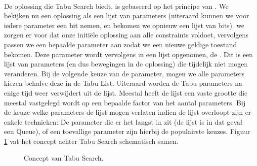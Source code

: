 \paragraph{}De oplossing die Tabu Search biedt, is gebaseerd op het principe van . We bekijken nu een oplossing als een lijst van parameters (uiteraard kunnen we voor iedere parameter een bit nemen, en bekomen we opnieuw een lijst van bits). we zorgen er voor dat onze initiële oplossing aan alle constraints voldoet, vervolgens passen we een bepaalde parameter aan zodat we een nieuwe geldige toestand bekomen. Deze parameter wordt vervolgens in een lijst opgenomen, de . Dit is een lijst van parameters (en dus bewegingen in de oplossing) die tijdelijk niet mogen veranderen. Bij de volgende keuze van de parameter, mogen we alle parameters kiezen behalve deze in de Tabu List. Uiteraard worden de Tabu parameters na enige tijd weer verwijdert uit de lijst. Meestal heeft de lijst een vaste grootte die meestal vastgelegd wordt op een bepaalde factor van het aantal parameters. Bij de keuze welke parameters de lijst mogen verlaten indien de lijst overloopt zijn er enkele technieken: De parameter die er het langst in zit (de lijst is in dat geval een Queue), of een toevallige parameter zijn hierbij de populairste keuzes. Figuur \ref{fig:tabuSearchConcept} vat het concept achter Tabu Search schematisch samen.
\begin{figure}[htb]
\centering
{}
\caption{Concept van Tabu Search.}
\label{fig:tabuSearchConcept}
\end{figure}

